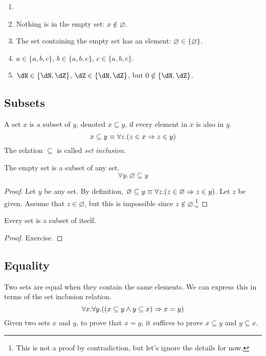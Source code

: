 \documentclass{amsart}
\begin{document}
\begin{eg}
  \begin{enumerate}
  \item[]
  \item Nothing is in the empty set: $x \notin \varnothing$.
  \item The set containing the empty set has an element: $\varnothing \in \{\varnothing\}$.
  \item $a \in \{ a, b, c \}$, $b \in \{ a, b, c \}$, $c \in \{ a, b, c \}$.
  \item $\dN \in \{ \dN, \dZ \}$, $\dZ \in \{ \dN, \dZ \}$, but $0 \notin \{ \dN,\dZ \}$.
  \end{enumerate}
\end{eg}

\subsection{Subsets}
\label{sec:subsets}

\begin{defn}
  A set $x$ is a subset of $y$, denoted $x \subseteq y$, if every element in $x$ is also in $y$.
  \[
    x \subseteq y \equiv \forall z.(z \in x \Rightarrow z \in y)
  \]
  The relation $\subseteq$ is called \emph{set inclusion}.
\end{defn}

\begin{lem}
  The empty set is a subset of any set.
  \[
    \forall y.\,\varnothing \subseteq y
  \]
\end{lem}
\begin{proof}
  Let $y$ be any set.
  By definition, $\varnothing \subseteq y \equiv \forall z.(z \in \varnothing \Rightarrow z \in y)$.
  Let $z$ be given.
  Assume that $z \in \varnothing$, but this is impossible since $z \notin \varnothing$.\footnote{This is not a proof by contradiction, but let's ignore the details for now.}
\end{proof}

\begin{lem}
  Every set is a subset of itself.
\end{lem}
\begin{proof}
  Exercise.
\end{proof}

\subsection{Equality}
\label{sec:equality}

Two sets are equal when they contain the same elements.
We can express this in terms of the set inclusion relation.
\[
  \forall x. \forall y. ((x \subseteq y \wedge y \subseteq x) \Rightarrow x = y)
\]
Given two sets $x$ and $y$, to prove that $x = y$, it suffices to prove $x \subseteq y$ and $y \subseteq x$.
\end{document}
